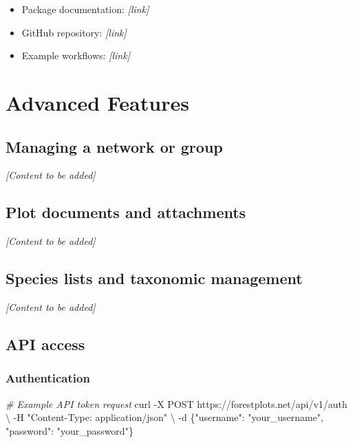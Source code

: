\documentclass[
]{book}
\newenvironment{Shaded}{\begin{snugshade}}{\end{snugshade}}
\newcommand{\AttributeTok}[1]{\textcolor[rgb]{0.13,0.29,0.53}{#1}}
\newcommand{\CommentTok}[1]{\textcolor[rgb]{0.56,0.35,0.01}{\textit{#1}}}
\newcommand{\DataTypeTok}[1]{\textcolor[rgb]{0.13,0.29,0.53}{#1}}
\newcommand{\ExtensionTok}[1]{#1}
\newcommand{\NormalTok}[1]{#1}
\newcommand{\StringTok}[1]{\textcolor[rgb]{0.31,0.60,0.02}{#1}}
\providecommand{\tightlist}{%
  \setlength{\itemsep}{0pt}\setlength{\parskip}{0pt}}
\begin{document}
\begin{itemize}
\tightlist
\item
  Package documentation: \emph{{[}link{]}}
\item
  GitHub repository: \emph{{[}link{]}}
\item
  Example workflows: \emph{{[}link{]}}
\end{itemize}

\chapter{Advanced Features}\label{advanced-features}

\section{Managing a network or group}\label{managing-a-network-or-group}

\emph{{[}Content to be added{]}}

\section{Plot documents and attachments}\label{plot-documents-and-attachments}

\emph{{[}Content to be added{]}}

\section{Species lists and taxonomic management}\label{species-lists-and-taxonomic-management}

\emph{{[}Content to be added{]}}

\section{API access}\label{api-access}

\subsection{Authentication}\label{authentication-1}

\begin{Shaded}
\begin{Highlighting}[]
\CommentTok{\# Example API token request}
\ExtensionTok{curl} \AttributeTok{{-}X}\NormalTok{ POST https://forestplots.net/api/v1/auth }\DataTypeTok{\textbackslash{}}
  \AttributeTok{{-}H} \StringTok{"Content{-}Type: application/json"} \DataTypeTok{\textbackslash{}}
  \AttributeTok{{-}d} \StringTok{\textquotesingle{}\{"username": "your\_username", "password": "your\_password"\}\textquotesingle{}}
\end{Highlighting}
\end{Shaded}
\end{document}
